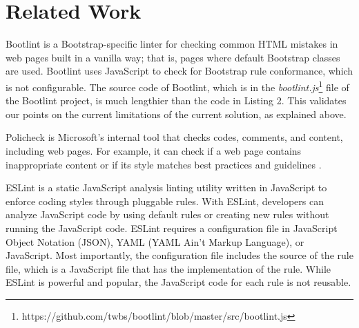 \section{Related Work}
Bootlint \cite{bootlint} is a Bootstrap-specific linter for checking common HTML mistakes in web pages built in a vanilla way; that is, pages where default Bootstrap classes are used. Bootlint uses JavaScript to check for Bootstrap rule conformance, which is not configurable. The source code of Bootlint, which is in the \textit{bootlint.js}\footnote{https://github.com/twbs/bootlint/blob/master/src/bootlint.js} file of the Bootlint project, is much lengthier than the code in Listing 2. This validates our points on the current limitations of the current solution, as explained above. 

Policheck is Microsoft's internal tool that checks codes, comments, and content, including web pages. For example, it can check if a web page contains inappropriate content or if its style matches best practices and guidelines \cite{christakis16}.

ESLint \cite{eslint} is a static JavaScript analysis linting utility written in JavaScript to enforce coding styles through pluggable rules. With ESLint, developers can analyze JavaScript code by using default rules or creating new rules without running the JavaScript code. ESLint requires a configuration file in JavaScript Object Notation (JSON), YAML (YAML Ain't Markup Language), or JavaScript. Most importantly, the configuration file includes the source of the rule file, which is a JavaScript file that has the implementation of the rule. While ESLint is powerful and popular, the JavaScript code for each rule is not reusable.
